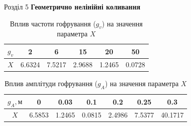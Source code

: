 \documentclass[handout, 8pt]{beamer}
\numberwithin{figure}{section}
\numberwithin{equation}{section}
\numberwithin{table}{section}
\begin{document}
\begin{frame}{Розділ 5}
\textbf{Геометрично нелінійні коливання}
\begin{table}[h!]
\caption{Вплив частоти гофрування ($g_v$) на значення параметра $X$}
\centering
 \begin{tabular}{| c | c | c | c | c | c |} 
 \hline
 $g_v$ & 2 & 6 & 15 & 20 & 50 \\ 
  \hline
 $X$ & 6.6324 & 7.5217 & 2.9688 & 1.2465 & 0.0728 \\
   \hline
\end{tabular}
\end{table}
\begin{table}[h!]
\caption{Вплив амплітуди гофрування ($g_A$) на значення параметра $X$}
\centering
 \begin{tabular}{| c | c | c | c | c | c | c |} 
 \hline
 $g_A, м$ & 0 & 0.03 & 0.1 & 0.2 & 0.25 & 0.3 \\ 
  \hline
 $X$ & 6.5853 & 1.2465 & 0.0815 & 2.4986 & 7.5377 & 40.1717 \\
   \hline
\end{tabular}
\end{table}
\begin{figure}[h]
\begin{minipage}[h]{0.49\linewidth}
\end{minipage}
\hfill
\begin{minipage}[h]{0.49\linewidth}

\end{minipage}
\end{figure}
\end{frame}
\end{document}
